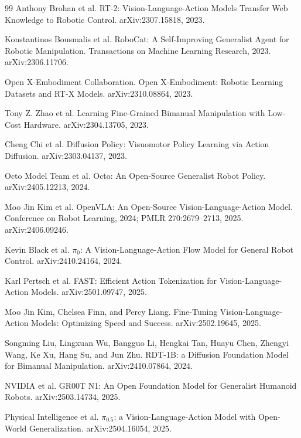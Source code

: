 \documentclass[11pt,oneside,openany]{oblivoir}
\numberwithin{section}{chapter}
\numberwithin{subsection}{section}
\numberwithin{equation}{chapter}
\begin{document}
\begin{thebibliography}{99}
Anthony Brohan et al.
\newblock RT-2: Vision-Language-Action Models Transfer Web Knowledge to Robotic Control.
\newblock arXiv:2307.15818, 2023.

Konstantinos Bousmalis et al.
\newblock RoboCat: A Self-Improving Generalist Agent for Robotic Manipulation.
\newblock Transactions on Machine Learning Research, 2023. arXiv:2306.11706.

Open X-Embodiment Collaboration.
\newblock Open X-Embodiment: Robotic Learning Datasets and RT-X Models.
\newblock arXiv:2310.08864, 2023.

Tony Z. Zhao et al.
\newblock Learning Fine-Grained Bimanual Manipulation with Low-Cost Hardware.
\newblock arXiv:2304.13705, 2023.

Cheng Chi et al.
\newblock Diffusion Policy: Visuomotor Policy Learning via Action Diffusion.
\newblock arXiv:2303.04137, 2023.

Octo Model Team et al.
\newblock Octo: An Open-Source Generalist Robot Policy.
\newblock arXiv:2405.12213, 2024.

Moo Jin Kim et al.
\newblock OpenVLA: An Open-Source Vision-Language-Action Model.
\newblock Conference on Robot Learning, 2024; PMLR 270:2679--2713, 2025. arXiv:2406.09246.

Kevin Black et al.
\newblock $\pi_0$: A Vision-Language-Action Flow Model for General Robot Control.
\newblock arXiv:2410.24164, 2024.

Karl Pertsch et al.
\newblock FAST: Efficient Action Tokenization for Vision-Language-Action Models.
\newblock arXiv:2501.09747, 2025.

Moo Jin Kim, Chelsea Finn, and Percy Liang.
\newblock Fine-Tuning Vision-Language-Action Models: Optimizing Speed and Success.
\newblock arXiv:2502.19645, 2025.

Songming Liu, Lingxuan Wu, Bangguo Li, Hengkai Tan, Huayu Chen,
Zhengyi Wang, Ke Xu, Hang Su, and Jun Zhu.
\newblock RDT-1B: a Diffusion Foundation Model for Bimanual Manipulation.
\newblock arXiv:2410.07864, 2024.

NVIDIA et al.
\newblock GR00T N1: An Open Foundation Model for Generalist Humanoid Robots.
\newblock arXiv:2503.14734, 2025.

Physical Intelligence et al.
\newblock $\pi_{0.5}$: a Vision-Language-Action Model with Open-World Generalization.
\newblock arXiv:2504.16054, 2025.


\end{thebibliography}
\end{document}
